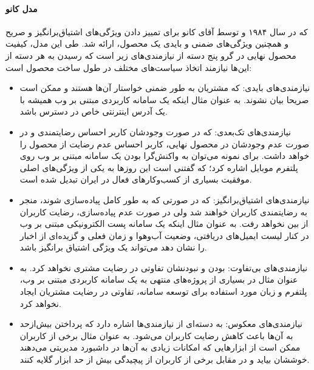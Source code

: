 \paragraph{مدل کانو}
که در سال ۱۹۸۴ و توسط آقای کانو
\cite{kano_attractive_1984}
برای تمییز دادن ویژگی‌های اشتیاق‌برانگیز و صریح و همچنین ویژگی‌های ضمنی و بایدی یک محصول، ارائه شد. طی این مدل، کیفیت محصول نهایی در گرو پنج دسته از نیازمندی‌های زیر است که رسیدن به هر دسته از این‌ها نیازمند اتخاذ سیاست‌های مختلف در طول ساخت محصول است:
\begin{itemize}
	\item 
	نیازمندی‌های بایدی: که مشتریان به طور ضمنی خواستار آن‌ها هستند و ممکن است صریحا بیان نشوند. به عنوان مثال اینکه یک سامانه کاربردی مبتنی بر وب همیشه با یک آدرس اینترنتی خاص
	در دسترس باشد.
	\item
	نیازمندی‌های تک‌بعدی: که در صورت وجودشان کاربر احساس رضایتمندی و در صورت عدم وجودشان در محصول نهایی، کاربر احساس عدم رضایت از محصول را خواهد داشت. برای نمونه می‌توان به واکنش‌گرا بودن یک سامانه مبتنی بر وب روی پلتفرم موبایل اشاره کرد؛ که گفتنی است این روزها به یکی از ویژگی‌های اصلی موفقیت بسیاری از کسب‌وکارهای فعال در ایران تبدیل شده است.
	\item 
	نیازمندی‌های اشتیاق‌برانگیز: که در صورتی که به طور کامل پیاده‌سازی شوند، منجر به رضایتمندی کاربران خواهند شد ولی در صورت عدم پیاده‌سازی، رضایت کاربران از بین نخواهد رفت. به عنوان مثال اینکه یک سامانه پست الکترونیکی مبتنی بر وب در کنار لیست ایمیل‌های دریافتی، وضعیت آب‌وهوا و زمان فعلی و گزیده‌ای از اخبار را نشان دهد می‌تواند یک ویژگی اشتیاق برانگیز باشد.
	\item 
	نیازمندی‌های بی‌تفاوت: بودن و نبودنشان تفاوتی در رضایت مشتری نخواهد کرد. به عنوان مثال در بسیاری از پروژه‌های منتهی به یک سامانه کاربردی مبتنی بر وب، پلتفرم و زبان مورد استفاده برای توسعه سامانه، تفاوتی در رضایت مشتریان ایجاد نخواهد کرد.
	\item 
	نیازمندی‌های معکوس: به دسته‌ای از نیازمندی‌ها اشاره دارد که پرداختن بیش‌ازحد به آن‌ها باعث کاهش رضایت کاربران می‌شود. به عنوان مثال برخی از کاربران ممکن است از ابزارهایی که امکانات زیادی به آن‌ها در داشبورد مدیریتی می‌دهند خوششان بیاید و در مقابل برخی از کاربران از پیچیدگی بیش از حد ابزار گلایه کنند.
\end{itemize}

